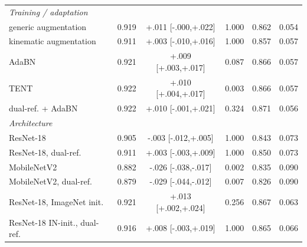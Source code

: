 \begin{table}[t]
\begin{tabular}{lccccc}
\multicolumn{6}{l}{\emph{Training / adaptation}} \\
\quad generic augmentation & 0.919 & +.011 [-.000,+.022] & 1.000 & 0.862 & 0.054 \\
\quad kinematic augmentation & 0.911 & +.003 [-.010,+.016] & 1.000 & 0.857 & 0.057 \\
\quad AdaBN & 0.921 & +.009 [+.003,+.017] & 0.087 & 0.866 & 0.057 \\
\quad TENT & 0.922 & +.010 [+.004,+.017] & 0.003 & 0.866 & 0.057 \\
\quad dual-ref. + AdaBN & 0.922 & +.010 [-.001,+.021] & 0.324 & 0.871 & 0.056 \\
\multicolumn{6}{l}{\emph{Architecture}} \\
\quad ResNet-18 & 0.905 & -.003 [-.012,+.005] & 1.000 & 0.843 & 0.073 \\
\quad ResNet-18, dual-ref. & 0.911 & +.003 [-.003,+.009] & 1.000 & 0.850 & 0.073 \\
\quad MobileNetV2 & 0.882 & -.026 [-.038,-.017] & 0.002 & 0.835 & 0.090 \\
\quad MobileNetV2, dual-ref. & 0.879 & -.029 [-.044,-.012] & 0.007 & 0.826 & 0.090 \\
\quad ResNet-18, ImageNet init. & 0.921 & +.013 [+.002,+.024] & 0.256 & 0.867 & 0.063 \\
\quad ResNet-18 IN-init., dual-ref. & 0.916 & +.008 [-.003,+.019] & 1.000 & 0.865 & 0.066 \\
\bottomrule
\end{tabular}
\end{table}